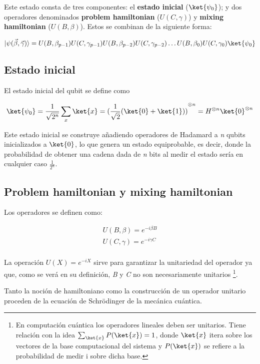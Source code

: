 Este estado consta de tres componentes: el \textbf{estado inicial} ($\ket{\psi_0}$); y dos operadores denominados \textbf{problem hamiltonian} ($U(C, \gamma)$) y \textbf{mixing hamiltonian} ($U(B, \beta)$).
Estos se combinan de la siguiente forma:

\[
  \lvert\psi(\vec{\beta}, \vec{\gamma})\rangle = U(B, \beta_{p-1})U(C, \gamma_{p-1})U(B, \beta_{p-2})U(C, \gamma_{p-2}) \ldots U(B, \beta_0)U(C, \gamma_0) \ket{\psi_0}
\]

\subsection{Estado inicial}
El estado inicial del qubit se define como

\begin{align*}
  \ket{\psi_0} = \frac{1}{\sqrt{2^n}} \sum_x\ket{x}
  = {(\frac{1}{\sqrt{2}} (\ket{0} + \ket{1}))}^{\otimes n}
  = H^{\otimes n} \ket{0}^{\otimes n}
\end{align*}

Este estado inicial se construye añadiendo operadores de Hadamard a \textit{n} qubits inicializados a $\ket{0}$, lo que genera un estado equiprobable, es decir, donde la probabilidad de obtener una cadena dada de \textit{n} bits al medir el estado sería en cualquier caso $\frac{1}{2^n}$.

\subsection{Problem hamiltonian y mixing hamiltonian}

Los operadores se definen como:

\begin{align*}
  U(B, \beta) = e^{-i \beta B} \\
  U(C, \gamma) = e^{-i \gamma C} \\
\end{align*}

La operación \(U(X) = e^{-i X}\) sirve para garantizar la unitariedad del operador ya que, como se verá en su definición, \textit{B} y \textit{C} no son necesariamente unitarios
\footnote{En computación cuántica los operadores lineales deben ser unitarios. Tiene relación con la idea
  $\sum_{\ket{x}} {P(\ket{x})} = 1$,
  donde $\ket{x}$ itera sobre los vectores de la base computacional del sistema y
  \(P(\ket{x})\) se refiere a la probabilidad de medir i sobre dicha base.}.

Tanto la noción de hamiltoniano como la construcción de un operador unitario proceden de la ecuación de Schrödinger de la mecánica cuántica.

